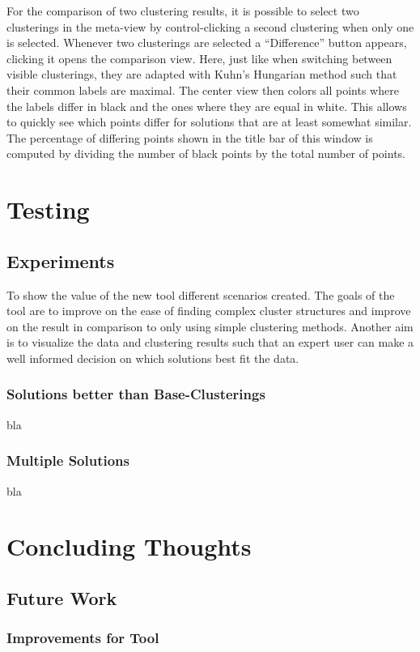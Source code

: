 \documentclass[
	a4paper,
	english,
	twoside,
	openright,               
	11pt                            
	]{report}
\begin{document}
For the comparison of two clustering results, it is possible to select two clusterings in the meta-view by control-clicking a second clustering when only one is selected. Whenever two clusterings are selected a ``Difference'' button appears, clicking it opens the comparison view. Here, just like when switching between visible clusterings, they are adapted with Kuhn’s Hungarian method \cite{Kuhn2010} such that their common labels are maximal. The center view then colors all points where the labels differ in black and the ones where they are equal in white. This allows to quickly see which points differ for solutions that are at least somewhat similar. The percentage of differing points shown in the title bar of this window is computed by dividing the number of black points by the total number of points.

\part{Testing}
\chapter{Experiments}\label{cha:experiments}
To show the value of the new tool different scenarios created. The goals of the tool are to improve on the ease of finding complex cluster structures and improve on the result in comparison to only using simple clustering methods. Another aim is to visualize the data and clustering results such that an expert user can make a well informed decision on which solutions best fit the data.
\section{Solutions better than Base-Clusterings}
bla

\section{Multiple Solutions}
bla

\part{Concluding Thoughts}

\chapter{Future Work}\label{cha:futurework}

\section{Improvements for Tool}
\end{document}
